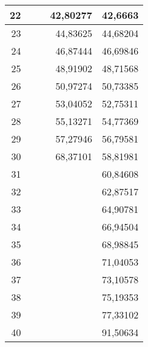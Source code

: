 \begin{tabular}{r|r|r|r|r|}
\hline
        22 &            &            &   42,80277 &    42,6663 \\
\hline
        23 &            &            &   44,83625 &   44,68204 \\
\hline
        24 &            &            &   46,87444 &   46,69846 \\
\hline
        25 &            &            &   48,91902 &   48,71568 \\
\hline
        26 &            &            &   50,97274 &   50,73385 \\
\hline
        27 &            &            &   53,04052 &   52,75311 \\
\hline
        28 &            &            &   55,13271 &   54,77369 \\
\hline
        29 &            &            &   57,27946 &   56,79581 \\
\hline
        30 &            &            &   68,37101 &   58,81981 \\
\hline
        31 &            &            &            &   60,84608 \\
\hline
        32 &            &            &            &   62,87517 \\
\hline
        33 &            &            &            &   64,90781 \\
\hline
        34 &            &            &            &   66,94504 \\
\hline
        35 &            &            &            &   68,98845 \\
\hline
        36 &            &            &            &   71,04053 \\
\hline
        37 &            &            &            &   73,10578 \\
\hline
        38 &            &            &            &   75,19353 \\
\hline
        39 &            &            &            &   77,33102 \\
\hline
        40 &            &            &            &   91,50634 \\
\hline
\end{tabular}  
